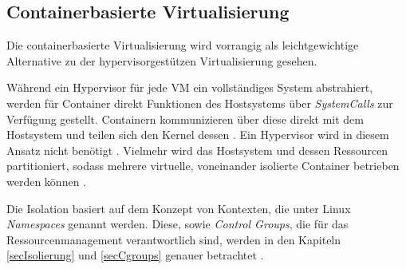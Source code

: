 \documentclass[../main.tex]{subfiles}
\begin{document}








    \subsection{Containerbasierte Virtualisierung}
    \label{introVirtContainer}
      Die containerbasierte Virtualisierung wird vorrangig als leichtgewichtige Alternative zu der hypervisorgestützen Virtualisierung gesehen\cite[S.2]{containerVirtPerformance}.

			Während ein Hypervisor für jede \acrshort{VM} ein vollständiges System abstrahiert, werden für Container direkt Funktionen des Hostsystems über \emph{\glspl{SystemCall}} zur Verfügung gestellt. Containern kommunizieren über diese direkt mit dem Hostsystem und teilen sich den Kernel dessen \cite[S.6f.]{dockerBook}\cite[S.2]{containerVirtPerformance}. Ein Hypervisor wird in diesem Ansatz nicht benötigt .	Vielmehr wird das Hostsystem und dessen Ressourcen partitioniert, sodass mehrere virtuelle, voneinander isolierte Container betrieben werden können \cite[S.3]{dockerSecIntro}\cite[S.1]{dockerSec2}.

			Die Isolation basiert auf dem Konzept von Kontexten, die unter Linux \emph{Namespaces} genannt werden. Diese, sowie \emph{Control Groups}, die für das Ressourcenmanagement verantwortlich sind, werden in den Kapiteln \ref{secIsolierung} und \ref{secCgroups} genauer betrachtet \cite[S.4]{dockerSecIntro}.
\end{document}
